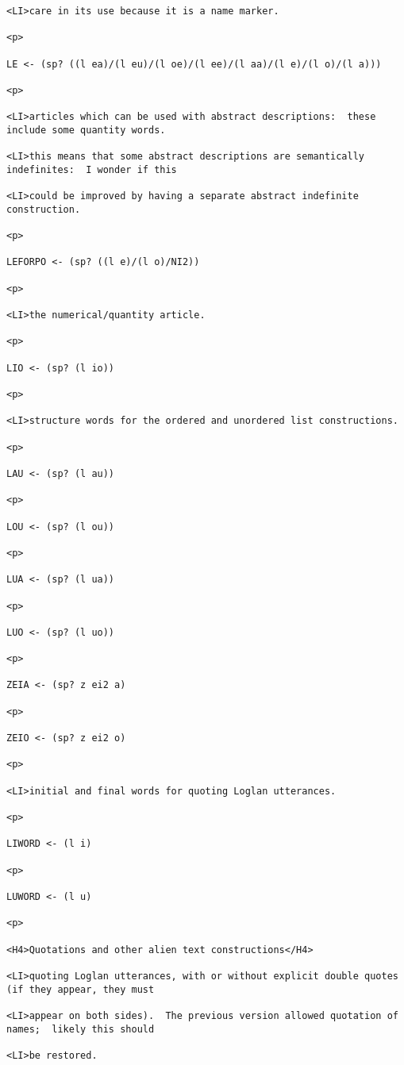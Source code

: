 \documentclass[12pt]{article}
\begin{document}
\begin{lstlisting}
<LI>care in its use because it is a name marker.

<p>

LE <- (sp? ((l ea)/(l eu)/(l oe)/(l ee)/(l aa)/(l e)/(l o)/(l a)))

<p>

<LI>articles which can be used with abstract descriptions:  these include some quantity words.

<LI>this means that some abstract descriptions are semantically indefinites:  I wonder if this

<LI>could be improved by having a separate abstract indefinite construction.

<p>

LEFORPO <- (sp? ((l e)/(l o)/NI2))

<p>

<LI>the numerical/quantity article.

<p>

LIO <- (sp? (l io))

<p>

<LI>structure words for the ordered and unordered list constructions.

<p>

LAU <- (sp? (l au))

<p>

LOU <- (sp? (l ou))

<p>

LUA <- (sp? (l ua))

<p>

LUO <- (sp? (l uo))

<p>

ZEIA <- (sp? z ei2 a)

<p>

ZEIO <- (sp? z ei2 o)

<p>

<LI>initial and final words for quoting Loglan utterances.

<p>

LIWORD <- (l i)

<p>

LUWORD <- (l u)

<p>

<H4>Quotations and other alien text constructions</H4>

<LI>quoting Loglan utterances, with or without explicit double quotes (if they appear, they must

<LI>appear on both sides).  The previous version allowed quotation of names;  likely this should

<LI>be restored.


\end{lstlisting}
\end{document}
